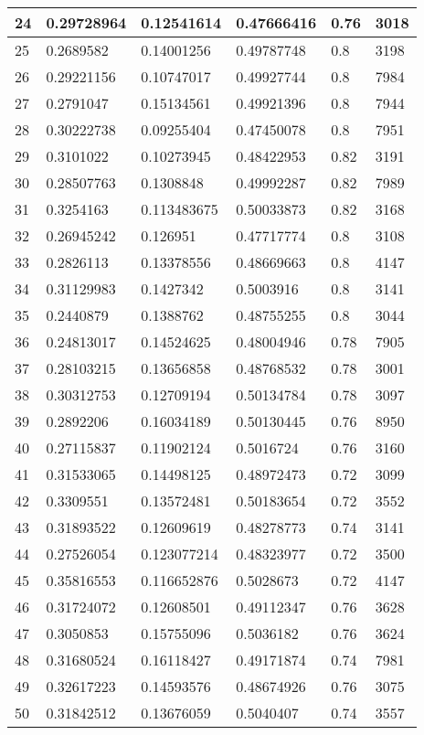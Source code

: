\begin{longtable}{|l|l|l|l|l|l|}
24 & 0.29728964 & 0.12541614 & 0.47666416 & 0.76 & 3018 \\ \hline 
25 & 0.2689582 & 0.14001256 & 0.49787748 & 0.8 & 3198 \\ \hline 
26 & 0.29221156 & 0.10747017 & 0.49927744 & 0.8 & 7984 \\ \hline 
27 & 0.2791047 & 0.15134561 & 0.49921396 & 0.8 & 7944 \\ \hline 
28 & 0.30222738 & 0.09255404 & 0.47450078 & 0.8 & 7951 \\ \hline 
29 & 0.3101022 & 0.10273945 & 0.48422953 & 0.82 & 3191 \\ \hline 
30 & 0.28507763 & 0.1308848 & 0.49992287 & 0.82 & 7989 \\ \hline 
31 & 0.3254163 & 0.113483675 & 0.50033873 & 0.82 & 3168 \\ \hline 
32 & 0.26945242 & 0.126951 & 0.47717774 & 0.8 & 3108 \\ \hline 
33 & 0.2826113 & 0.13378556 & 0.48669663 & 0.8 & 4147 \\ \hline 
34 & 0.31129983 & 0.1427342 & 0.5003916 & 0.8 & 3141 \\ \hline 
35 & 0.2440879 & 0.1388762 & 0.48755255 & 0.8 & 3044 \\ \hline 
36 & 0.24813017 & 0.14524625 & 0.48004946 & 0.78 & 7905 \\ \hline 
37 & 0.28103215 & 0.13656858 & 0.48768532 & 0.78 & 3001 \\ \hline 
38 & 0.30312753 & 0.12709194 & 0.50134784 & 0.78 & 3097 \\ \hline 
39 & 0.2892206 & 0.16034189 & 0.50130445 & 0.76 & 8950 \\ \hline 
40 & 0.27115837 & 0.11902124 & 0.5016724 & 0.76 & 3160 \\ \hline 
41 & 0.31533065 & 0.14498125 & 0.48972473 & 0.72 & 3099 \\ \hline 
42 & 0.3309551 & 0.13572481 & 0.50183654 & 0.72 & 3552 \\ \hline 
43 & 0.31893522 & 0.12609619 & 0.48278773 & 0.74 & 3141 \\ \hline 
44 & 0.27526054 & 0.123077214 & 0.48323977 & 0.72 & 3500 \\ \hline 
45 & 0.35816553 & 0.116652876 & 0.5028673 & 0.72 & 4147 \\ \hline 
46 & 0.31724072 & 0.12608501 & 0.49112347 & 0.76 & 3628 \\ \hline 
47 & 0.3050853 & 0.15755096 & 0.5036182 & 0.76 & 3624 \\ \hline 
48 & 0.31680524 & 0.16118427 & 0.49171874 & 0.74 & 7981 \\ \hline 
49 & 0.32617223 & 0.14593576 & 0.48674926 & 0.76 & 3075 \\ \hline 
50 & 0.31842512 & 0.13676059 & 0.5040407 & 0.74 & 3557 \\ \hline 
\end{longtable}